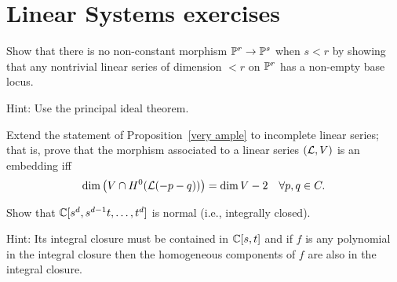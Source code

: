 


\chapter{Linear Systems exercises}\label{linear systems exercises}


\begin{exercise}\label{here there be basepoints}
 Show that there is no non-constant morphism $\PP^r\to \PP^s$ when $s<r$ by showing that any nontrivial linear
 series of dimension $<r$ on $\PP^r$ has a non-empty base locus.
 
 Hint: Use the principal ideal theorem.
\end{exercise}
 
\begin{exercise}
Extend the statement of Proposition~\ref{very ample} to incomplete linear series; that is, prove that the morphism associated to a linear series $(\cL, V)$ is an embedding iff
$$
\dim\big( V \cap H^0(\cL(-p-q))\big) = \dim V - 2 \quad \forall p, q \in C.
$$
\end{exercise}


\begin{exercise}\label{normality of RNC}
 Show that $\CC[s^d,s^{d-1}t,\dots, t^d]$ is normal (i.e., integrally closed).
 
 Hint: Its integral closure must be
 contained in $\CC[s,t]$ and if $f$ is any polynomial
 in the integral closure then the homogeneous components of $f$ are also in the integral closure.
\end{exercise}

